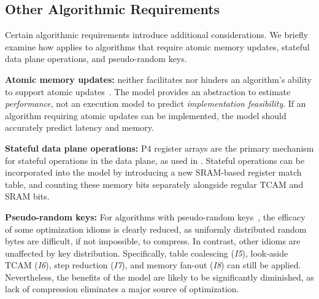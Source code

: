 \subsection{Other Algorithmic Requirements}\label{subsec:constraints}

Certain algorithmic requirements introduce additional considerations. We briefly examine how \cram applies to algorithms that require atomic memory updates, stateful data plane operations, and pseudo-random keys.

\textbf{Atomic memory updates:} \cram neither facilitates nor hinders an algorithm’s ability to support atomic updates~\cite{p4dfa, flowradar, atomic_updates_data_plane}. The \cram model provides an abstraction to estimate {\em performance}, not an execution model to predict {\em implementation feasibility}. If an algorithm requiring atomic updates can be implemented, the \cram model should accurately predict latency and memory.


\textbf{Stateful data plane operations:} P4 register arrays are the primary mechanism for stateful operations in the data plane, as used in \cite{hashpipe, snap, conquest}. Stateful operations can be incorporated into the \cram model by introducing a new SRAM-based register match table, and counting these memory bits separately alongside regular TCAM and SRAM bits.



\textbf{Pseudo-random keys:} For algorithms with pseudo-random keys~\cite{halfsiphash, netcache, aes}, the efficacy of some \cram optimization idioms is clearly reduced, as uniformly distributed random bytes are difficult, if not impossible, to compress. In contrast, other idioms are unaffected by key distribution. Specifically, table coalescing ({\em I5}), look-aside TCAM ({\em I6}), step reduction ({\em I7}), and memory fan-out ({\em I8}) can still be applied. Nevertheless, the benefits of the \cram model are likely to be significantly diminished, as lack of compression eliminates a major source of optimization.